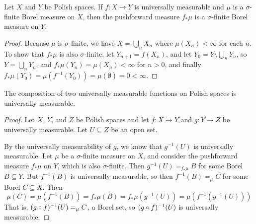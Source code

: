 \documentclass[10pt]{article}
\begin{document}
\begin{lemma}
    Let $X$ and $Y$ be Polish spaces.
    If $f : X \to Y$ is universally measurable and $\mu$ is a $\sigma$-finite Borel measure on $X$, then the pushforward measure $f_* \mu$ is a $\sigma$-finite Borel measure on $Y$.
\end{lemma}
\begin{proof}
    Because $\mu$ is $\sigma$-finite, we have $X = \bigcup_n X_n$ where $\mu(X_n) < \infty$ for each $n$.
    To show that $f_*\mu$ is also $\sigma$-finite, let $Y_{n+1} = f(X_n)$, and let $Y_0 = Y \setminus \bigcup_n Y_n$, so $Y = \bigcup_n Y_n$, and $f_*\mu(Y_n) = \mu(X_n) < \infty$ for $n > 0$, and finally $f_*\mu(Y_0) = \mu(f^{-1}(Y_0)) = \mu(\emptyset) = 0 < \infty$.
\end{proof}

\begin{proposition}[Exercise 95]
    The composition of two universally measurable functions on Polish spaces is universally measurable.
\end{proposition}
\begin{proof}
    Let $X$, $Y$, and $Z$ be Polish spaces and let $f : X \to Y$ and $g : Y \to Z$ be universally measurable.
    Let $U \subseteq Z$ be an open set.

    By the universally measurability of $g$, we know that $g^{-1}(U)$ is universally measurable.
    Let $\mu$ be a $\sigma$-finite measure on $X$, and consider the pushforward measure $f_{*}\mu$ on $Y$, which is also $\sigma$-finite.
    Then $g^{-1}(U) =_{f_*\mu} B$ for some Borel $B \subseteq Y$.
    But $f^{-1}(B)$ is universally measurable, so then $f^{-1}(B) =_\mu C$ for some Borel $C \subseteq X$.
    Then
    \[
        \mu(C) = \mu(f^{-1}(B)) = f_*\mu(B) = f_*\mu(g^{-1}(U)) = \mu(f^{-1}(g^{-1}(U)))
    \]
    That is, $(g \circ f)^{-1}(U) =_\mu C$, a Borel set, so $(g \circ f)^{-1}(U)$ is universally measurable.
\end{proof}
\end{document}
